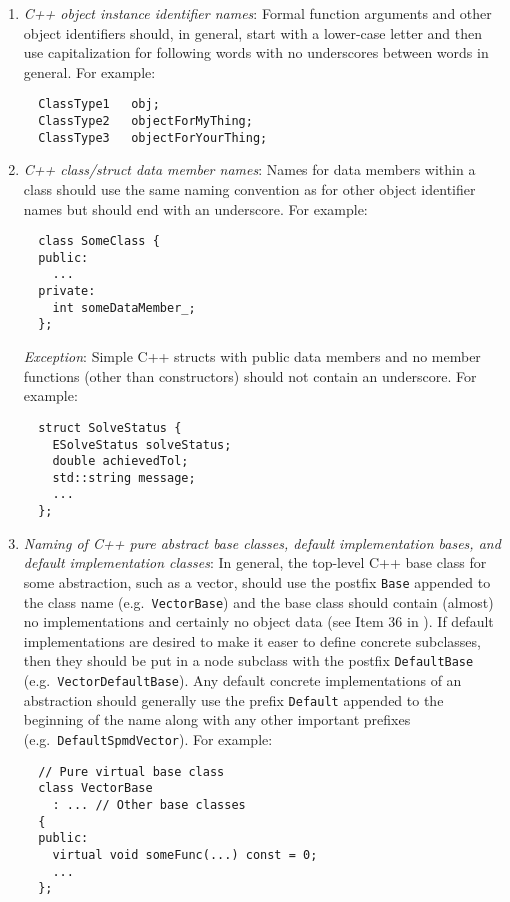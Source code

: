 \begin{enumerate}
{}\item\textit{C++ object instance identifier names}: Formal function
arguments and other object identifiers should, in general, start with a
lower-case letter and then use capitalization for following words with no
underscores between words in general.  For example:

{\small\begin{verbatim}
  ClassType1   obj;
  ClassType2   objectForMyThing;
  ClassType3   objectForYourThing;
\end{verbatim}}

{}\item\textit{C++ class/struct data member names}: Names for data members
within a class should use the same naming convention as for other object
identifier names but should end with an underscore.  For example:

{\small\begin{verbatim}
  class SomeClass {
  public:
    ...
  private:
    int someDataMember_;
  };
\end{verbatim}}

{}\textit{Exception}: Simple C++ structs with public data members and no
member functions (other than constructors) should not contain an underscore.
For example:

{\small\begin{verbatim}
  struct SolveStatus {
    ESolveStatus solveStatus;
    double achievedTol;
    std::string message;
    ...
  };
\end{verbatim}}

{}\item\textit{Naming of C++ pure abstract base classes, default
implementation bases, and default implementation classes}: In general, the
top-level C++ base class for some abstraction, such as a vector, should use
the postfix {}\texttt{Base} appended to the class name (e.g.\
{}\texttt{Vector\-Base}) and the base class should contain (almost) no
implementations and certainly no object data (see Item 36 in
{}\cite{C++CodingStandards05}).  If default implementations are desired to make
it easer to define concrete subclasses, then they should be put in a node
subclass with the postfix {}\texttt{DefaultBase} (e.g.\
{}\texttt{Vector\-Default\-Base}).  Any default concrete implementations of an
abstraction should generally use the prefix {}\texttt{Default} appended to the
beginning of the name along with any other important prefixes (e.g.\
{}\texttt{DefaultSpmdVector}).  For example:

{\small\begin{verbatim}
  // Pure virtual base class 
  class VectorBase
    : ... // Other base classes
  {
  public:
    virtual void someFunc(...) const = 0;
    ...
  };


\end{verbatim}}
\end{enumerate}
